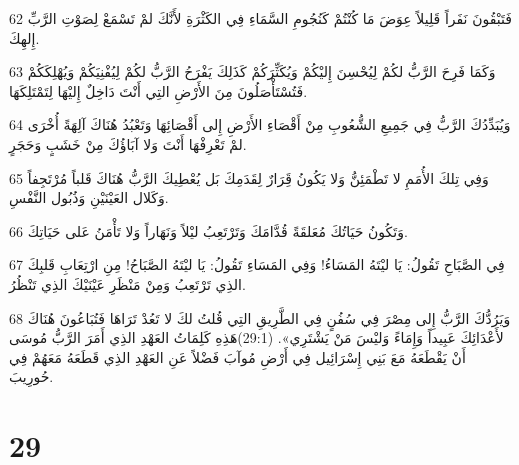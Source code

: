 \par 62 فَتَبْقُونَ نَفَراً قَلِيلاً عِوَضَ مَا كُنْتُمْ كَنُجُومِ السَّمَاءِ فِي الكَثْرَةِ لأَنَّكَ لمْ تَسْمَعْ لِصَوْتِ الرَّبِّ إِلهِكَ.
\par 63 وَكَمَا فَرِحَ الرَّبُّ لكُمْ لِيُحْسِنَ إِليْكُمْ وَيُكَثِّرَكُمْ كَذَلِكَ يَفْرَحُ الرَّبُّ لكُمْ لِيُفْنِيَكُمْ وَيُهْلِكَكُمْ فَتُسْتَأْصَلُونَ مِنَ الأَرْضِ التِي أَنْتَ دَاخِلٌ إِليْهَا لِتَمْتَلِكَهَا.
\par 64 وَيُبَدِّدُكَ الرَّبُّ فِي جَمِيعِ الشُّعُوبِ مِنْ أَقْصَاءِ الأَرْضِ إِلى أَقْصَائِهَا وَتَعْبُدُ هُنَاكَ آلِهَةً أُخْرَى لمْ تَعْرِفْهَا أَنْتَ وَلا آبَاؤُكَ مِنْ خَشَبٍ وَحَجَرٍ.
\par 65 وَفِي تِلكَ الأُمَمِ لا تَطْمَئِنُّ وَلا يَكُونُ قَِرَارٌ لِقَدَمِكَ بَل يُعْطِيكَ الرَّبُّ هُنَاكَ قَلباً مُرْتَجِفاً وَكَلال العَيْنَيْنِ وَذُبُول النَّفْسِ.
\par 66 وَتَكُونُ حَيَاتُكَ مُعَلقَةً قُدَّامَكَ وَتَرْتَعِبُ ليْلاً وَنَهَاراً وَلا تَأْمَنُ عَلى حَيَاتِكَ.
\par 67 فِي الصَّبَاحِ تَقُولُ: يَا ليْتَهُ المَسَاءُ! وَفِي المَسَاءِ تَقُولُ: يَا ليْتَهُ الصَّبَاحُ! مِنِ ارْتِعَابِ قَلبِكَ الذِي تَرْتَعِبُ وَمِنْ مَنْظَرِ عَيْنَيْكَ الذِي تَنْظُرُ.
\par 68 وَيَرُدُّكَ الرَّبُّ إِلى مِصْرَ فِي سُفُنٍ فِي الطَّرِيقِ التِي قُلتُ لكَ لا تَعُدْ تَرَاهَا فَتُبَاعُونَ هُنَاكَ لأَعْدَائِكَ عَبِيداً وَإِمَاءً وَليْسَ مَنْ يَشْتَرِي». (29:1)هَذِهِ كَلِمَاتُ العَهْدِ الذِي أَمَرَ الرَّبُّ مُوسَى أَنْ يَقْطَعَهُ مَعَ بَنِي إِسْرَائِيل فِي أَرْضِ مُوآبَ فَضْلاً عَنِ العَهْدِ الذِي قَطَعَهُ مَعَهُمْ فِي حُورِيبَ.

\chapter{29}

